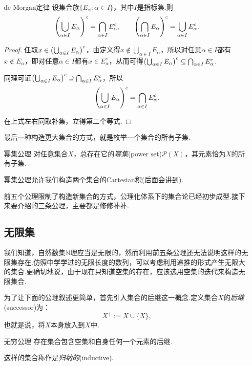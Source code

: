 \begin{theorem}{de Morgan定律}
	设集合族$\{ E_{\alpha} : \alpha \in I \}$，其中$I$是指标集.则$$\left( \bigcup_{\alpha \in I}E_{\alpha}  \right)^c = \bigcap_{\alpha \in I} E_{\alpha}^c,\qquad \left( \bigcap_{\alpha \in I}E_{\alpha}  \right)^c = \bigcup_{\alpha \in I} E_{\alpha}^c.$$
\end{theorem}
\begin{proof}
	任取$x \in \left( \bigcup_{\alpha \in I}E_{\alpha}  \right)^c$，由定义得$x \notin \bigcup_{\alpha \in I}E_{\alpha}$，所以对任意$\alpha \in I$都有$x \notin E_{\alpha}$，即对任意$\alpha \in I$都有$x \in E_{\alpha}^c$，从而可得$\left( \bigcup_{\alpha \in I}E_{\alpha}  \right)^c \subseteq \bigcap_{\alpha \in I} E_{\alpha}^c$.
	
	同理可证$\left( \bigcup_{\alpha \in I}E_{\alpha}  \right)^c \supseteq \bigcap_{\alpha \in I} E_{\alpha}^c$，所以$$\left( \bigcup_{\alpha \in I}E_{\alpha}  \right)^c = \bigcap_{\alpha \in I} E_{\alpha}^c.$$
	
	在上式左右同取补集，立得第二个等式.
\end{proof}

最后一种构造更大集合的方式，就是枚举一个集合的所有子集.

\begin{axiom}{幂集公理}
	对任意集合$X$，总存在它的\textit{幂集}(power set)$\mathcal{P}(X)$，其元素恰为$X$的所有子集.
\end{axiom}

幂集公理允许我们构造两个集合的Cartesian积(后面会讲到).

前五个公理限制了构造新集合的方式，公理化体系下的集合论已经初步成型.接下来要介绍的三条公理，主要都是修修补补.

\subsection{无限集}

我们知道，自然数集$\mathbb{N}$理应当是无限的，然而利用前五条公理还无法说明这样的无限集存在.仿照中学学过的无限长度的数列，可以考虑利用递推的形式产生无限大的集合.更确切地说，由于现在只知道空集的存在，应该选用空集的迭代来构造无限集合.

为了让下面的公理叙述更简单，首先引入集合的后继这一概念.定义集合$X$的\textit{后继}(successor)为：$$X^{+} := X \cup \{ X \},$$
也就是说，将$X$本身放入到$X$中.

\begin{axiom}{无穷公理}
	存在集合包含空集和自身任何一个元素的后继.
\end{axiom}
\begin{remark}
	这样的集合称作是\textit{归纳的}(inductive).
\end{remark}

